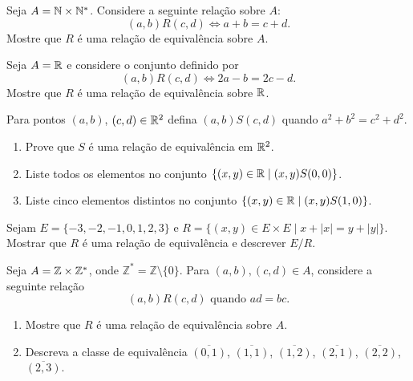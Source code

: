 \documentclass[12pt]{exam}
\begin{document}
\vspace{.3cm}


\questao Seja $A=\mathbb{N}\times \mathbb{N}^*$. Considere a seguinte
rela{\c c}{\~a}o sobre $A$:
\[
(a,b)R (c,d) \Leftrightarrow a + b = c + d.
\]
Mostre que $R$ {\'e} uma rela{\c c}{\~a}o de equival{\^e}ncia sobre $A$.

\vspace{.3cm}

\questao Seja $A = \mathbb{R}$ e considere o conjunto definido por
\[
  (a,b)R(c,d) \Leftrightarrow 2a - b = 2c - d.
\]
Mostre que $R$ \'e uma rela\c{c}\~ao de equival\^encia sobre $\mathbb{R}$.

\vspace{.3cm}

\questao Para pontos $(a, b)$, $(c, d) \in \mathbb{R}^2$ defina $(a, b) S (c, d)$ quando $a^2 + b^2 = c^2 + d^2$.
\begin{enumerate}[label={\alph*})]
  \item Prove que $S$ \'e uma rela\c{c}\~ao de equival\^encia em $\mathbb{R}^2$.
  \item Liste todos os elementos no conjunto $\{(x, y) \in \mathbb{R} \mid (x, y) S (0, 0)\}$.
  \item Liste cinco elementos distintos no conjunto $\{(x, y) \in \mathbb{R} \mid (x, y) S (1, 0)\}$.
\end{enumerate}

\vspace{.3cm}

\questao Sejam $E = \{-3, -2, -1, 0, 1, 2, 3\}$ e $R = \{(x, y) \in E \times E \mid x + |x| = y + |y|\}$. Mostrar que $R$ \'e uma rela\c{c}\~ao de equival\^encia e descrever $E/R$.

\vspace{.3cm}

\questao Seja $A=\mathbb{Z}\times \mathbb{Z}^*$, onde
$\mathbb{Z}^*=\mathbb{Z}\setminus \{0\}$. Para $(a,b), (c,d) \in
A$, considere a seguinte rela{\c c}{\~a}o
\[
(a,b)R (c,d) \mbox{ quando } ad=bc.
\]
\begin{enumerate}[label={\alph*})]
\item Mostre que $R$ {\'e} uma rela{\c c}{\~a}o de equival{\^e}ncia sobre $A$.
\item Descreva a classe de equival{\^e}ncia $\overline{(0,1)}$, $\overline{(1,1)}$, $\overline{(1,2)}$, $\overline{(2,1)}$, $\overline{(2,2)}$, $\overline{(2,3)}$.
\end{enumerate}

\vspace{.3cm}
\end{document}
